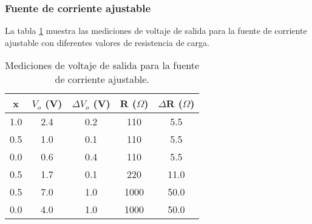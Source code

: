 \FloatBarrier
\subsubsection{Fuente de corriente ajustable}

La tabla \ref{tab:mediciones-fuente-corriente-ajustable} muestra las mediciones de voltaje de salida para la fuente de corriente ajustable con diferentes valores de resistencia de carga.

\begin{table}[ht]
    \centering
    \begin{tabular}{|c|c|c|c|c|}
        \hline
        x & $V_o$ (V) & $\Delta V_o$ (V) & R ($\Omega$) & $\Delta$R ($\Omega$) \\
        \hline
        1.0 & 2.4 & 0.2 & 110 & 5.5 \\
        0.5 & 1.0 & 0.1 & 110 & 5.5 \\
        0.0 & 0.6 & 0.4 & 110 & 5.5 \\
        0.5 & 1.7 & 0.1 & 220 & 11.0 \\
        0.5 & 7.0 & 1.0 & 1000 & 50.0 \\
        0.0 & 4.0 & 1.0 & 1000 & 50.0 \\
        \hline
    \end{tabular}
    \caption{Mediciones de voltaje de salida para la fuente de corriente ajustable.}
    \label{tab:mediciones-fuente-corriente-ajustable}
\end{table}






